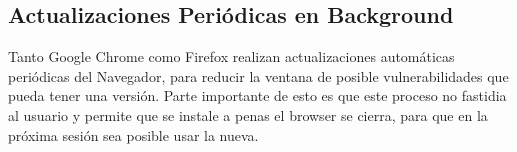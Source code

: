 



 \subsection{Actualizaciones Periódicas en Background}
 Tanto Google Chrome \cite{reis2009browser} como Firefox realizan actualizaciones automáticas periódicas del Navegador, para reducir la ventana de posible vulnerabilidades que pueda tener una versión. Parte importante de esto es que este proceso no fastidia al usuario y permite que se instale a penas el browser se cierra, para que en la próxima sesión sea posible usar la nueva.


